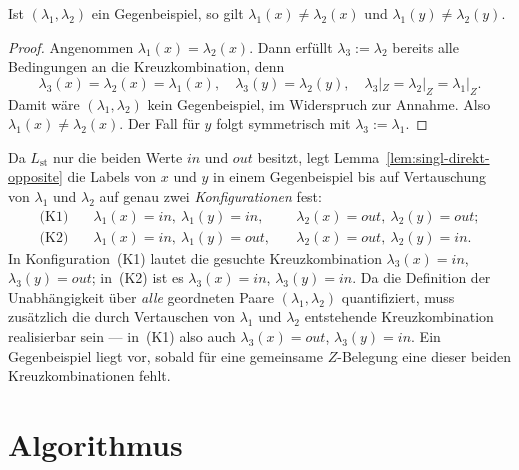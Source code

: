\newpage

\begin{Lemma}
    \label{lem:singl-direkt-opposite}
    Ist \((\lambda_1,\lambda_2)\) ein Gegenbeispiel, so gilt
    \(\lambda_1(x)\neq\lambda_2(x)\) und \(\lambda_1(y)\neq\lambda_2(y)\).
\end{Lemma}

\begin{proof}
    \label{pr:singl-direkt-opposite}
    Angenommen \(\lambda_1(x)=\lambda_2(x)\). Dann erfüllt
    \(\lambda_3:=\lambda_2\) bereits alle Bedingungen an die
    Kreuzkombination, denn
    \[
        \lambda_3(x)=\lambda_2(x)=\lambda_1(x),\quad
        \lambda_3(y)=\lambda_2(y),\quad
        \lambda_3|_Z=\lambda_2|_Z=\lambda_1|_Z.
    \]
    Damit wäre \((\lambda_1,\lambda_2)\) kein Gegenbeispiel, im Widerspruch
    zur Annahme. Also \(\lambda_1(x)\neq\lambda_2(x)\). Der Fall für \(y\)
    folgt symmetrisch mit \(\lambda_3:=\lambda_1\).
\end{proof}

Da \(L_{\mathrm{st}}\) nur die beiden Werte \(\mathit{in}\) und
\(\mathit{out}\) besitzt, legt Lemma~\ref{lem:singl-direkt-opposite} die Labels
von \(x\) und \(y\) in einem Gegenbeispiel bis auf Vertauschung von
\(\lambda_1\) und \(\lambda_2\) auf genau zwei \emph{Konfigurationen} fest:
\[
\begin{aligned}
    \text{(K1)}\quad &
    \lambda_1(x)=\mathit{in},\ \lambda_1(y)=\mathit{in},
    &\quad
    \lambda_2(x)=\mathit{out},\ \lambda_2(y)=\mathit{out};\\
    \text{(K2)}\quad &
    \lambda_1(x)=\mathit{in},\ \lambda_1(y)=\mathit{out},
    &\quad
    \lambda_2(x)=\mathit{out},\ \lambda_2(y)=\mathit{in}.
\end{aligned}
\]
In Konfiguration~(K1) lautet die gesuchte Kreuzkombination
\(\lambda_3(x)=\mathit{in}\), \(\lambda_3(y)=\mathit{out}\); in~(K2) ist es
\(\lambda_3(x)=\mathit{in}\), \(\lambda_3(y)=\mathit{in}\). Da die Definition
der Unabhängigkeit über \emph{alle} geordneten Paare \((\lambda_1,\lambda_2)\)
quantifiziert, muss zusätzlich die durch Vertauschen von \(\lambda_1\) und
\(\lambda_2\) entstehende Kreuzkombination realisierbar sein --- in~(K1) also
auch \(\lambda_3(x)=\mathit{out}\), \(\lambda_3(y)=\mathit{in}\). Ein
Gegenbeispiel liegt vor, sobald für eine gemeinsame \(Z\)-Belegung eine dieser
beiden Kreuzkombinationen fehlt.

\section{Algorithmus}
\label{sec:singl-direkt-algo}

